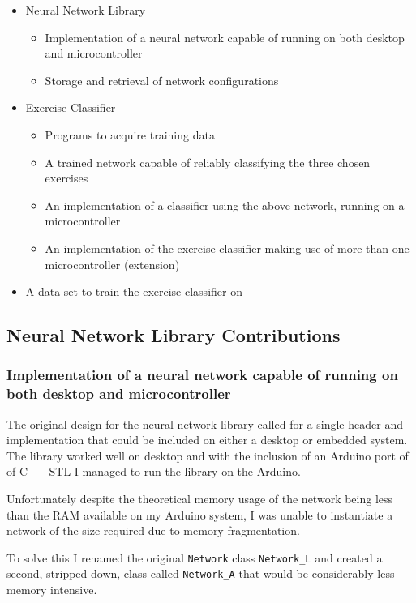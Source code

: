 \documentclass[a4paper]{article}
\begin{document}
\begin{itemize}
\item Neural Network Library 
  \begin{itemize}
  \item Implementation of a neural network capable of running on  both desktop and microcontroller
    \item Storage and retrieval of network configurations
  \end{itemize}
\item Exercise Classifier
  \begin{itemize}
  \item Programs to acquire training data
    \item A trained network capable of reliably classifying the three chosen exercises
    \item An implementation of a classifier using the above network, running on a microcontroller
    \item An implementation of the exercise classifier making use of more than one microcontroller (extension)
  \end{itemize}
\item A data set to train the exercise classifier on
\end{itemize}

\subsection{Neural Network Library Contributions}%
\label{subsec:ev_nn}

\subsubsection{Implementation of a neural network capable of running on  both desktop and microcontroller}

The original design for the neural network library called for a single header and implementation that could be included on either a desktop or embedded system. The library worked well on desktop and with the inclusion of an Arduino port of of C++ STL\cite{evref1} I managed to run the library on the Arduino. 

Unfortunately despite the theoretical memory usage of the network being less than the RAM available on my Arduino system, I was unable to instantiate a network of the size required due to memory fragmentation. 

To solve this I renamed the original \lstinline{Network} class \lstinline{Network_L} and created a second, stripped down, class called \lstinline{Network_A} that would be considerably less memory intensive.
\end{document}

